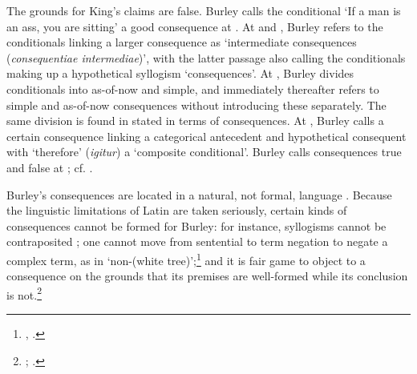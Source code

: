 \documentclass[]{birkjour}
\begin{document}
{	The grounds for King's claims are false. Burley calls the conditional `If a man is an ass, you are sitting' a good consequence at \autocite[p. 61]{BurleyDPAL}. At \autocite[p. 89.1-31]{BurleyDPAL} and \autocite[p. 114, par. 8]{Green-Pedersen1980b}, Burley refers to the conditionals linking a larger consequence as `intermediate consequences (\textit{consequentiae intermediae})', with the latter passage also calling the conditionals making up a hypothetical syllogism `consequences'. At \autocite[p. 128, par. 68]{Green-Pedersen1980b}, Burley divides conditionals into as-of-now and simple, and immediately thereafter refers to simple and as-of-now consequences without introducing these separately. The same division is found in \autocite[pp. 60.28-61.5]{BurleyDPAL} stated in terms of consequences. At \autocite[p. 78.27-30]{BurleyDPAL}, Burley calls a certain consequence linking a categorical antecedent and hypothetical consequent with `therefore' (\textit{igitur}) a `composite conditional'. Burley calls consequences true and false at \autocite[p. 113, par. 2-3]{Green-Pedersen1980b}; cf. \autocite[p. 15, par. 19]{Green-Pedersen1980a}.} 

Burley's consequences are located in a natural, not formal, language \autocite[pp. 4-5]{HodgesBurley}. Because the linguistic limitations of Latin are taken seriously, certain kinds of consequences cannot be formed for Burley: for instance, syllogisms cannot be contraposited \autocite[pp. 65.3-17; 207.31-208.9]{BurleyDPAL}; one cannot move from sentential to term negation to negate a complex term, as in `non-(white tree)';\footnote{\cite[p. 131, par. 80]{Green-Pedersen1980b}, \cite[pp. 214.14-21, 215.6-21]{BurleyDPAL}.} and it is fair game to object to a consequence on the grounds that its premises are well-formed while its conclusion is not.\footnote{\autocite[p. 150, par. 135]{Green-Pedersen1980b}; \autocite[pp. 211.31-33, 212.10-20]{BurleyDPAL}.}
\end{document}
